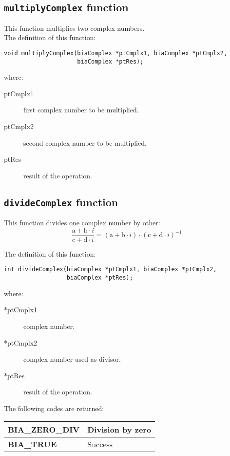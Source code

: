 \subsection{\texttt{multiplyComplex} function}

This function multiplies two complex numbers.\\

The definition of this function:
%
\begin{verbatim}
void multiplyComplex(biaComplex *ptCmplx1, biaComplex *ptCmplx2, 
                     biaComplex *ptRes);  
\end{verbatim}
%
where:
%
\begin{description}
\item[ptCmplx1] first complex number to be multiplied. 
\item[ptCmplx2] second complex number to be multiplied.
\item[ptRes] result of the operation.
\end{description}

\subsection{\texttt{divideComplex} function}

This function divides one complex number by other:
%
\begin{displaymath}
\frac{\mathrm{a} + \mathrm{b} \cdot i}{\mathrm{c} + \mathrm{d} \cdot i} = (\mathrm{a} + \mathrm{b} \cdot i) \cdot (\mathrm{c} + \mathrm{d} \cdot i)^{-1}  
\end{displaymath}

The definition of this function:
%
\begin{verbatim}
int divideComplex(biaComplex *ptCmplx1, biaComplex *ptCmplx2, 
                  biaComplex *ptRes);
\end{verbatim}
%
where:
%
\begin{description}
\item[*ptCmplx1] complex number.
\item[*ptCmplx2] complex number used as divisor. 
\item[*ptRes] result of the operation.
\end{description}
%
The following codes are returned:
%
\begin{center}
\begin{tabular}{|l|l|}
\hline
\textbf{BIA\_ZERO\_DIV} & Division by zero \\
\hline
\textbf{BIA\_TRUE} & Success \\
\hline
\end{tabular}
\end{center} 

